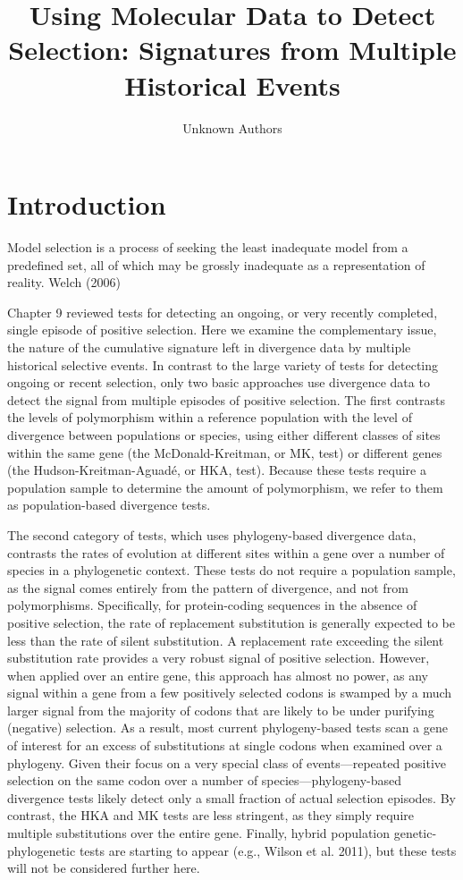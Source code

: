 \documentclass{article}
\title{Using Molecular Data to Detect Selection: Signatures from Multiple Historical Events}
\author{Unknown Authors}
\date{}
\begin{document}
\maketitle

\begin{abstract}

\end{abstract}

\section{Introduction}
Model selection is a process of seeking the least inadequate model from a predefined set, all of which may be grossly inadequate as a representation of reality. Welch (2006)

Chapter 9 reviewed tests for detecting an ongoing, or very recently completed, single episode of positive selection. Here we examine the complementary issue, the nature of the cumulative signature left in divergence data by multiple historical selective events. In contrast to the large variety of tests for detecting ongoing or recent selection, only two basic approaches use divergence data to detect the signal from multiple episodes of positive selection. The first contrasts the levels of polymorphism within a reference population with the level of divergence between populations or species, using either different classes of sites within the same gene (the McDonald-Kreitman, or MK, test) or different genes (the Hudson-Kreitman-Aguadé, or HKA, test). Because these tests require a population sample to determine the amount of polymorphism, we refer to them as population-based divergence tests.

The second category of tests, which uses phylogeny-based divergence data, contrasts the rates of evolution at different sites within a gene over a number of species in a phylogenetic context. These tests do not require a population sample, as the signal comes entirely from the pattern of divergence, and not from polymorphisms. Specifically, for protein-coding sequences in the absence of positive selection, the rate of replacement substitution is generally expected to be less than the rate of silent substitution. A replacement rate exceeding the silent substitution rate provides a very robust signal of positive selection. However, when applied over an entire gene, this approach has almost no power, as any signal within a gene from a few positively selected codons is swamped by a much larger signal from the majority of codons that are likely to be under purifying (negative) selection. As a result, most current phylogeny-based tests scan a gene of interest for an excess of substitutions at single codons when examined over a phylogeny. Given their focus on a very special class of events—repeated positive selection on the same codon over a number of species—phylogeny-based divergence tests likely detect only a small fraction of actual selection episodes. By contrast, the HKA and MK tests are less stringent, as they simply require multiple substitutions over the entire gene. Finally, hybrid population genetic-phylogenetic tests are starting to appear (e.g., Wilson et al. 2011), but these tests will not be considered further here.
\end{document}
